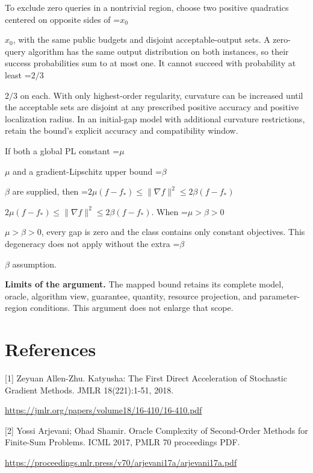 \documentclass[10pt,a4paper]{article}
\newcommand{\AtlasMath}[1]{\par\begingroup\centering\setbox0=\hbox{$\displaystyle #1$}\ifdim\wd0>1.4\linewidth\typeout{ATLAS WIDE FORMULA: \the\wd0}\fi\ifdim\wd0>\linewidth\resizebox{\linewidth}{!}{\box0}\else\box0\fi\par\endgroup}
\newcommand{\AtlasInlineMath}[1]{\begingroup\setbox0=\hbox{$#1$}\ifdim\wd0>.4\linewidth\endgroup\AtlasMath{#1}\else\endgroup$#1$\fi}
\begin{document}
To exclude zero queries in a nontrivial region, choose two positive quadratics centered on opposite sides of \AtlasInlineMath{x_0}, with the same public budgets and disjoint acceptable-output sets. A zero-query algorithm has the same output distribution on both instances, so their success probabilities sum to at most one. It cannot succeed with probability at least \AtlasInlineMath{2/3} on each. With only highest-order regularity, curvature can be increased until the acceptable sets are disjoint at any prescribed positive accuracy and positive localization radius. In an initial-gap model with additional curvature restrictions, retain the bound's explicit accuracy and compatibility window.

If both a global PL constant \AtlasInlineMath{\mu} and a gradient-Lipschitz upper bound \AtlasInlineMath{\beta} are supplied, then \AtlasInlineMath{2\mu(f-f_*)\le\|\nabla f\|^2\le2\beta(f-f_*)}. When \AtlasInlineMath{\mu>\beta>0}, every gap is zero and the class contains only constant objectives. This degeneracy does not apply without the extra \AtlasInlineMath{\beta} assumption.

\textbf{Limits of the argument.} The mapped bound retains its complete model, oracle, algorithm view, guarantee, quantity, resource projection, and parameter-region conditions. This argument does not enlarge that scope.

\section{References}
[1] Zeyuan Allen-Zhu. Katyusha: The First Direct Acceleration of Stochastic Gradient Methods. JMLR 18(221):1-51, 2018.

\url{https://jmlr.org/papers/volume18/16-410/16-410.pdf}

[2] Yossi Arjevani; Ohad Shamir. Oracle Complexity of Second-Order Methods for Finite-Sum Problems. ICML 2017, PMLR 70 proceedings PDF.

\url{https://proceedings.mlr.press/v70/arjevani17a/arjevani17a.pdf}
\end{document}
